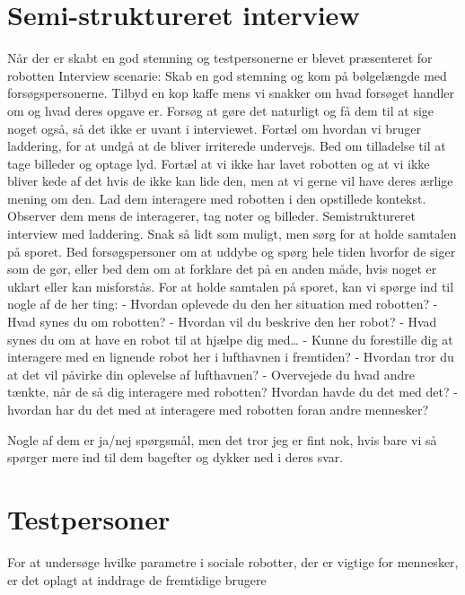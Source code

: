 \section{Semi-struktureret interview}
\label{ParametreInterview}
%
Når der er skabt en god stemning og testpersonerne er blevet præsenteret for robotten
Interview scenarie:
Skab en god stemning og kom på bølgelængde med forsøgspersonerne. Tilbyd en kop kaffe mens vi snakker om hvad forsøget handler om og hvad deres opgave er. Forsøg at gøre det naturligt og få dem til at sige noget også, så det ikke er uvant i interviewet. Fortæl om hvordan vi bruger laddering, for at undgå at de bliver irriterede undervejs. Bed om tilladelse til at tage billeder og optage lyd. Fortæl at vi ikke har lavet robotten og at vi ikke bliver kede af det hvis de ikke kan lide den, men at vi gerne vil have deres ærlige mening om den.
Lad dem interagere med robotten i den opstillede kontekst.
Observer dem mens de interagerer, tag noter og billeder.
Semistruktureret interview med laddering. Snak så lidt som muligt, men sørg for at holde samtalen på sporet. Bed forsøgspersoner om at uddybe og spørg hele tiden hvorfor de siger som de gør, eller bed dem om at forklare det på en anden måde, hvis noget er uklart eller kan misforstås. For at holde samtalen på sporet, kan vi spørge ind til nogle af de her ting:
-	Hvordan oplevede du den her situation med robotten?
-	Hvad synes du om robotten?
-	Hvordan vil du beskrive den her robot?
-	Hvad synes du om at have en robot til at hjælpe dig med…
-	Kunne du forestille dig at interagere med en lignende robot her i lufthavnen i fremtiden?
-	Hvordan tror du at det vil påvirke din oplevelse af lufthavnen?
-	Overvejede du hvad andre tænkte, når de så dig interagere med robotten? Hvordan havde du det med det?
-	hvordan har du det med at interagere med robotten foran andre mennesker?

Nogle af dem er ja/nej spørgsmål, men det tror jeg er fint nok, hvis bare vi så spørger mere ind til dem bagefter og dykker ned i deres svar. 

\section{Testpersoner}
\label{ParametreTestpersoner}
%
For at undersøge hvilke parametre i sociale robotter, der er vigtige for mennesker, er det oplagt at inddrage de fremtidige brugere